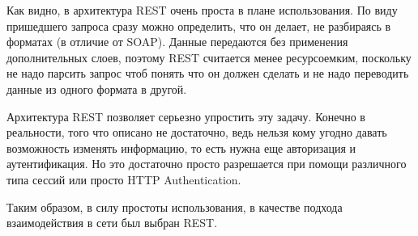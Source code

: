 Как видно, в архитектура REST очень проста в плане использования. По виду пришедшего запроса сразу можно определить, что он делает, не разбираясь в форматах (в отличие от SOAP). Данные передаются без применения дополнительных слоев, поэтому REST считается менее ресурсоемким, поскольку не надо парсить запрос чтоб понять что он должен сделать и не надо переводить данные из одного формата в другой.

Архитектура REST позволяет серьезно упростить эту задачу. Конечно в реальности, того что описано не достаточно, ведь нельзя кому угодно давать возможность изменять информацию, то есть нужна еще авторизация и аутентификация. Но это достаточно просто разрешается при помощи различного типа сессий или просто HTTP Authentication.

Таким образом, в силу простоты использования, в качестве подхода взаимодействия в сети был выбран REST.